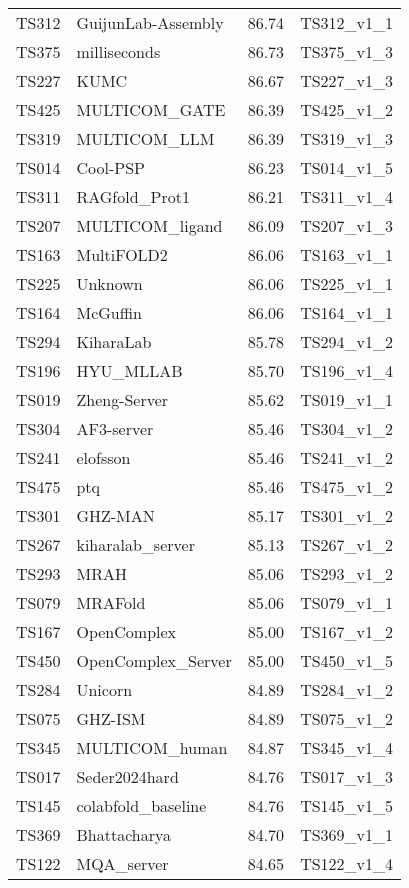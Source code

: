 \begin{longtable}{llll}
TS312 & GuijunLab-Assembly & 86.74 & TS312\_v1\_1 \\ 
TS375 & milliseconds & 86.73 & TS375\_v1\_3 \\ 
TS227 & KUMC & 86.67 & TS227\_v1\_3 \\ 
TS425 & MULTICOM\_GATE & 86.39 & TS425\_v1\_2 \\ 
TS319 & MULTICOM\_LLM & 86.39 & TS319\_v1\_3 \\ 
TS014 & Cool-PSP & 86.23 & TS014\_v1\_5 \\ 
TS311 & RAGfold\_Prot1 & 86.21 & TS311\_v1\_4 \\ 
TS207 & MULTICOM\_ligand & 86.09 & TS207\_v1\_3 \\ 
TS163 & MultiFOLD2 & 86.06 & TS163\_v1\_1 \\ 
TS225 & Unknown & 86.06 & TS225\_v1\_1 \\ 
TS164 & McGuffin & 86.06 & TS164\_v1\_1 \\ 
TS294 & KiharaLab & 85.78 & TS294\_v1\_2 \\ 
TS196 & HYU\_MLLAB & 85.70 & TS196\_v1\_4 \\ 
TS019 & Zheng-Server & 85.62 & TS019\_v1\_1 \\ 
TS304 & AF3-server & 85.46 & TS304\_v1\_2 \\ 
TS241 & elofsson & 85.46 & TS241\_v1\_2 \\ 
TS475 & ptq & 85.46 & TS475\_v1\_2 \\ 
TS301 & GHZ-MAN & 85.17 & TS301\_v1\_2 \\ 
TS267 & kiharalab\_server & 85.13 & TS267\_v1\_2 \\ 
TS293 & MRAH & 85.06 & TS293\_v1\_2 \\ 
TS079 & MRAFold & 85.06 & TS079\_v1\_1 \\ 
TS167 & OpenComplex & 85.00 & TS167\_v1\_2 \\ 
TS450 & OpenComplex\_Server & 85.00 & TS450\_v1\_5 \\ 
TS284 & Unicorn & 84.89 & TS284\_v1\_2 \\ 
TS075 & GHZ-ISM & 84.89 & TS075\_v1\_2 \\ 
TS345 & MULTICOM\_human & 84.87 & TS345\_v1\_4 \\ 
TS017 & Seder2024hard & 84.76 & TS017\_v1\_3 \\ 
TS145 & colabfold\_baseline & 84.76 & TS145\_v1\_5 \\ 
TS369 & Bhattacharya & 84.70 & TS369\_v1\_1 \\ 
TS122 & MQA\_server & 84.65 & TS122\_v1\_4 \\ 

\end{longtable}
